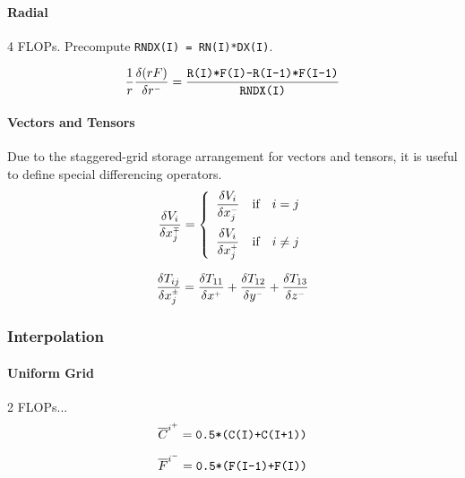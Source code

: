 \documentclass[11pt]{article}
\begin{document}
\paragraph{Radial} 4 FLOPs. Precompute {\tt RNDX(I) = RN(I)*DX(I)}.

\begin{equation}
\label{eqn_radial_difference}
\frac{1}{r} \frac{\delta (rF)}{\delta r^{\scriptscriptstyle -}} = \frac{\mbox{\tt R(I)*F(I)-R(I-1)*F(I-1)}}{\mbox{\tt RNDX(I)}}
\end{equation}

\paragraph{Vectors and Tensors} Due to the staggered-grid storage arrangement for vectors and tensors, it is useful to define special differencing operators.
\begin{equation}
\frac{\delta V_i}{\delta x_j^\ssmp} = \left\{ \begin{array}{ll} \displaystyle \frac{\delta V_i}{\delta x_j^\ssm} & \mbox{if} \quad i=j \vspace{.2cm} \\ \displaystyle \frac{\delta V_i}{\delta x_j^\ssp} & \mbox{if} \quad i\ne j \end{array} \right.
\end{equation}

\begin{equation}
\frac{\delta T_{ij}}{\delta x_j^{\scriptscriptstyle \pm}} = \frac{\delta T_{11}}{\delta x^{\scriptscriptstyle +}} + \frac{\delta T_{12}}{\delta y^{\scriptscriptstyle -}} + \frac{\delta T_{13}}{\delta z^{\scriptscriptstyle -}}
\end{equation}


\subsubsection{Interpolation}

\paragraph{Uniform Grid} 2 FLOPs...
\begin{equation}
\label{eqn_linear_interpolation}
\overline{C}^{i^+} = \mbox{\tt 0.5*(C(I)+C(I+1))}
\end{equation}

\begin{equation}
\label{eqn_linear_interpolation}
\overline{F}^{i^-} = \mbox{\tt 0.5*(F(I-1)+F(I))}
\end{equation}
\end{document}
